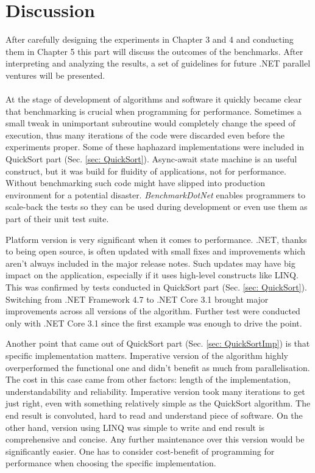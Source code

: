 \chapter{Discussion}
After carefully designing the experiments in Chapter 3 and 4 and conducting them in Chapter 5 this part will discuss the outcomes of the benchmarks. 
After interpreting and analyzing the results, a set of guidelines for future .NET parallel ventures will be presented. 
\\ \\ 
At the stage of development of algorithms and software it quickly became clear that benchmarking is crucial when programming for performance. 
Sometimes a small tweak in unimportant subroutine would completely change the speed of execution, thus many iterations of the code were discarded even before the experiments proper. 
Some of these haphazard implementations were included in QuickSort part (Sec. \ref{sec: QuickSort}). Async-await state machine is an useful construct, but it was build for fluidity of applications, not for performance. Without benchmarking such code might have slipped into production environment for a potential disaster. \emph{BenchmarkDotNet} enables programmers
to scale-back the tests so they can be used during development or even use them as part of their unit test suite.

Platform version is very significant when it comes to performance. .NET, thanks to being open source, is often updated with small fixes and improvements which aren't always included in the major release notes. Such updates may have big impact on the application, especially if it uses high-level constructs like LINQ. This was confirmed by tests conducted in QuickSort part (Sec. \ref{sec: QuickSort}). Switching from .NET Framework 4.7 to .NET Core 3.1 brought major improvements across all versions of the algorithm. Further test were conducted only with .NET Core 3.1 since the first example was enough to drive the point.

Another point that came out of QuickSort part (Sec. \ref{sec: QuickSortImp}) is that specific implementation matters. Imperative version of the algorithm highly overperformed the functional one and didn't benefit as much from parallelisation. The cost in this case came from other factors: length of the implementation, understandability and reliability. Imperative version took many iterations to get just right, even with something relatively simple as the QuickSort algorithm. The end result is convoluted, hard to read and understand piece of software. On the other hand, version using LINQ was simple to write and end result is comprehensive and concise. Any further maintenance over this version would be significantly easier. One has to consider cost-benefit of programming for performance when choosing the specific implementation. 

